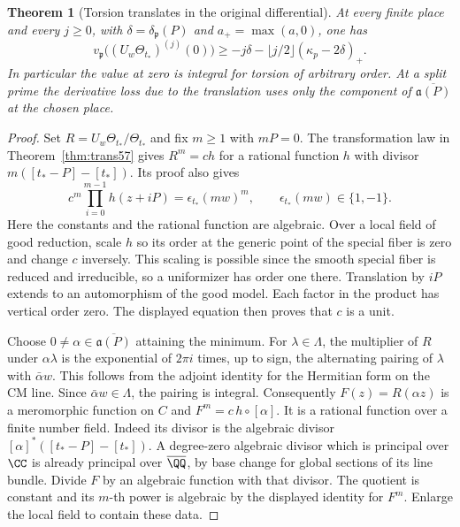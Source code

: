 \documentclass[a4paper,11pt]{article}
\newtheorem{theorem}[proposition]{Theorem}
\theoremstyle{definition}
\theoremstyle{remark}
\numberwithin{equation}{section}
\begin{document}
\begin{theorem}[Torsion translates in the original differential]\leavevmode
\label{thm:torsion312}
At every finite place and every \(j\ge0\), with
\(\delta=\delta_{\mathfrak p}(P)\) and \(a_+=\max(a,0)\), one has
\[
 v_{\mathfrak p}\big((U_w\Theta_{t_*})^{(j)}(0)\big)
 \ge -j\delta-\lfloor j/2\rfloor(\kappa_p-2\delta)_+ .
\]
In particular the value at zero is integral for torsion of arbitrary
order. At a split prime the derivative loss due to the translation
uses only the component of \(\overline{\mathfrak a(P)}\) at the
chosen place.
\end{theorem}
\begin{proof}
Set \(R=U_w\Theta_{t_*}/\Theta_{t_*}\) and fix \(m\ge1\) with
\(mP=0\). The transformation law in Theorem~\ref{thm:trans57}
gives \(R^m=ch\) for a rational function \(h\) with divisor
\(m([t_*-P]-[t_*])\). Its proof also gives
\[
 c^m\prod_{i=0}^{m-1}h(z+iP)=\epsilon_{t_*}(mw)^m,\qquad
                         \epsilon_{t_*}(mw)\in\{1,-1\}.
\]
Here the constants and the rational function are algebraic.
Over a local field of good reduction, scale \(h\) so its order at the
generic point of the special fiber is zero and change \(c\) inversely.
This scaling is possible since the smooth special fiber is reduced
and irreducible, so a uniformizer has order one there. Translation
by \(iP\) extends to an automorphism of the good model. Each factor
in the product has vertical order zero. The displayed equation
then proves that \(c\) is a unit.

Choose \(0\ne\alpha\in\overline{\mathfrak a(P)}\) attaining the
minimum. For \(\lambda\in\Lambda\), the multiplier of \(R\) under
\(\alpha\lambda\) is the exponential of \(2\pi i\) times, up to
sign, the alternating pairing of \(\lambda\) with \(\bar\alpha w\).
This follows from the adjoint identity for the Hermitian form on
the CM line. Since \(\bar\alpha w\in\Lambda\), the pairing is integral.
Consequently \(F(z)=R(\alpha z)\) is a meromorphic function on \(C\)
and \(F^m=c\,h\circ[\alpha]\). It is a rational function over a
finite number field. Indeed its divisor is the algebraic divisor
\([\alpha]^*([t_*-P]-[t_*])\). A degree-zero algebraic divisor
which is principal over \(\CC\) is already principal over
\(\overline{\QQ}\), by base change for global sections of its
line bundle. Divide \(F\) by an algebraic function with that divisor.
The quotient is constant and its \(m\)-th power is algebraic by
the displayed identity for \(F^m\). Enlarge the local field to
contain these data.


\end{proof}
\end{document}
